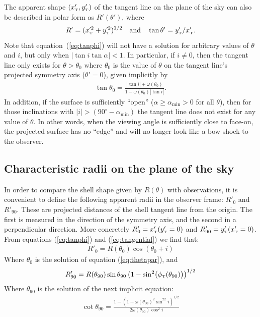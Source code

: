 The apparent shape \((x'_{\mathrm{\scriptscriptstyle T}}, y'_{\mathrm{\scriptscriptstyle T}})\) of the tangent line on the plane
of the sky can also be described in polar form as \(R'(\theta')\),
where
\begin{equation}
  \label{eq:R-prime-theta-prime}
  R' = (x'^2_{\mathrm{\scriptscriptstyle T}}+ y'^2_{\mathrm{\scriptscriptstyle T}})^{1/2} 
  \quad \text{and} \quad
  \tan\theta' = y'_{\mathrm{\scriptscriptstyle T}} / x'_{\mathrm{\scriptscriptstyle T}}.
\end{equation}
Note that equation~(\ref{eq:tanphi}) will not have
a solution for arbitrary values of $\theta$ and $i$, but only when
$|\tan i\tan\alpha|<1$. In particular, if $i\neq 0$, then the tangent
line only exists for \(\theta > \theta_{0}\) where \(\theta_{0}\) is the value of \(\theta\) on the tangent line's projected symmetry axis (\(\theta' = 0\)), 
given implicitly by
\begin{align}
\tan\theta_{0} = \frac{|\tan i| + \omega(\theta_{0})}{1-\omega(\theta_{0}) |\tan i|} . 
\label{eq:thetapar}
\end{align}
In addition, if the surface is sufficiently ``open''
(\(\alpha \ge \alpha_{\mathrm{min}} > 0\) for all \(\theta\)), then for those
inclinations with
\(\vert i\vert > (90^\circ - \alpha_{\mathrm{min}}) \) the tangent line does not exist
for any value of \(\theta\).  In other words, when the viewing angle is
sufficiently close to face-on, the projected surface has no ``edge''
and will no longer look like a bow shock to the observer.

\subsection{Characteristic radii on the plane of the sky}

In order to compare the shell shape given by $R(\theta)$ with observations,
it is convenient to define the following apparent radii in the observer frame: $R'_{0}$ and $R'_{90}$. These are projected distances of the shell tangent line
from the origin. The first is measured in the direction of the symmetry axis, and the second in a perpendicular direction. More concretely $R'_{0} = x'_{\mathrm{\scriptscriptstyle T}}(y'_{\mathrm{\scriptscriptstyle T}}=0)$
and $R'_{90} = y'_{\mathrm{\scriptscriptstyle T}}(x'_{\mathrm{\scriptscriptstyle T}}=0)$. From equations (\ref{eq:tanphi}) and (\ref{eq:tangential}) we find that:
\begin{align}
R'_{0} = R(\theta_{0})\cos(\theta_{0} + i) \label{eq:Rpar} 
\end{align}
Where $\theta_{0}$ is the solution of equation (\ref{eq:thetapar}), and
\begin{align}
  \label{eq:R90prime}
R'_{90} = R(\theta_{90})\sin\theta_{90}\left(1-\sin^2\bigl(\phi_{\mathrm{\scriptscriptstyle T}}(\theta_{90})\bigr)\right)^{1/2}
\end{align}
Where $\theta_{90}$ is the solution of the next implicit equation:
\begin{align}
  \label{eq:th90}
\cot\theta_{90} = \frac{1-\left(1+\omega(\theta_{90})^2\sin^22i\right)^{1/2}}{2\omega(\theta_{90})\cos^2 i}
\end{align}


